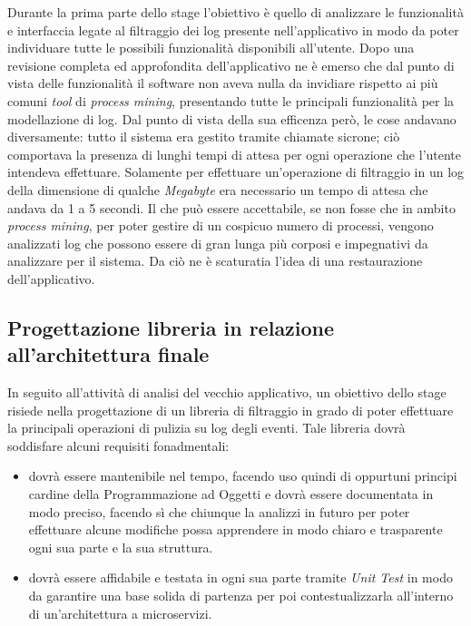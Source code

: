 Durante la prima parte dello stage l'obiettivo è quello di analizzare le funzionalità e interfaccia legate al filtraggio dei log presente nell'applicativo in modo da poter individuare tutte le possibili funzionalità disponibili all'utente. Dopo una revisione completa ed approfondita dell'applicativo ne è emerso che dal punto di vista delle funzionalità il software non aveva nulla da invidiare rispetto ai più comuni \textit{tool} di \textit{process mining}, presentando tutte le principali funzionalità per la modellazione di log. Dal punto di vista della sua efficenza però, le cose andavano diversamente: tutto il sistema era gestito tramite chiamate sicrone; ciò comportava la presenza di lunghi tempi di attesa per ogni operazione che l'utente intendeva effettuare. Solamente per effettuare un'operazione di filtraggio in un log della dimensione di qualche \textit{Megabyte} era necessario un tempo di attesa che andava da 1 a 5 secondi. Il che può essere accettabile, se non fosse che in ambito \textit{process mining}, per poter gestire di un cospicuo numero di processi, vengono analizzati log che possono essere di gran lunga più corposi e impegnativi da analizzare per il sistema. Da ciò ne è scaturatia l'idea di una restaurazione dell'applicativo.
\subsection{Progettazione libreria in relazione all'architettura finale}
In seguito all'attività di analisi del vecchio applicativo, un obiettivo dello stage risiede nella progettazione di un libreria di filtraggio in grado di poter effettuare la principali operazioni di pulizia su log degli eventi. Tale libreria dovrà soddisfare alcuni requisiti fonadmentali:
\begin{itemize}
	\item dovrà essere mantenibile nel tempo, facendo uso quindi di oppurtuni principi cardine della Programmazione ad Oggetti e dovrà essere documentata in modo preciso, facendo sì che chiunque la analizzi in futuro per poter effettuare alcune modifiche possa apprendere in modo chiaro e trasparente ogni sua parte e la sua struttura.
	\item dovrà essere affidabile e testata in ogni sua parte tramite \textit{Unit Test} in modo da garantire una base solida di partenza per poi contestualizzarla all'interno di un'architettura a microservizi.
\end{itemize}
